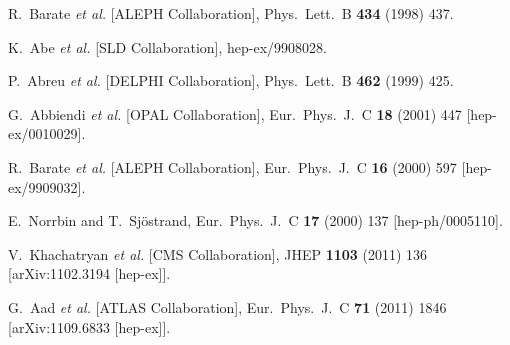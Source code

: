 \documentclass[a4paper,12pt]{article}
\begin{document}
\begin{thebibliography}{99}
  R.~Barate {\it et al.}  [ALEPH Collaboration],
  Phys.\ Lett.\ B {\bf 434} (1998) 437.
  
  K.~Abe {\it et al.}  [SLD Collaboration],
  hep-ex/9908028.
  
  P.~Abreu {\it et al.}  [DELPHI Collaboration],
  Phys.\ Lett.\ B {\bf 462} (1999) 425.

  G.~Abbiendi {\it et al.}  [OPAL Collaboration],
  Eur.\ Phys.\ J.\ C {\bf 18} (2001) 447
  [hep-ex/0010029].

  R.~Barate {\it et al.}  [ALEPH Collaboration],
  Eur.\ Phys.\ J.\ C {\bf 16} (2000) 597
  [hep-ex/9909032].
  
  E.~Norrbin and T.~Sjöstrand,
  Eur.\ Phys.\ J.\ C {\bf 17} (2000) 137
  [hep-ph/0005110].

  V.~Khachatryan {\it et al.}  [CMS Collaboration],
  JHEP {\bf 1103} (2011) 136
  [arXiv:1102.3194 [hep-ex]].

  G.~Aad {\it et al.}  [ATLAS Collaboration],
  Eur.\ Phys.\ J.\ C {\bf 71} (2011) 1846
  [arXiv:1109.6833 [hep-ex]].


\end{thebibliography}
\end{document}
